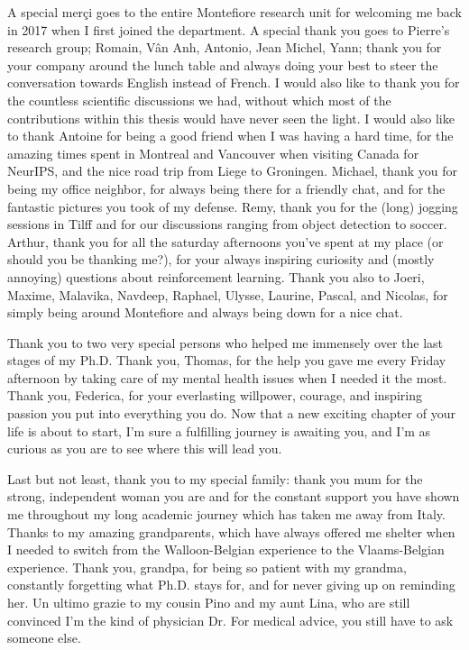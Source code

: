 A special merçi goes to the entire Montefiore research unit for welcoming me back in 2017 when I first joined the department. A special thank you goes to Pierre's research group; Romain, Vân Anh, Antonio, Jean Michel, Yann; thank you for your company around the lunch table and always doing your best to steer the conversation towards English instead of French. I would also like to thank you for the countless scientific discussions we had, without which most of the contributions within this thesis would have never seen the light. I would also like to thank Antoine for being a good friend when I was having a hard time, for the amazing times spent in Montreal and Vancouver when visiting Canada for NeurIPS, and the nice road trip from Liege to Groningen. Michael, thank you for being my office neighbor, for always being there for a friendly chat, and for the fantastic pictures you took of my defense. Remy, thank you for the (long) jogging sessions in Tilff and for our discussions ranging from object detection to soccer. Arthur, thank you for all the saturday afternoons you've spent at my place (or should you be thanking me?), for your always inspiring curiosity and (mostly annoying) questions about reinforcement learning. Thank you also to Joeri, Maxime, Malavika, Navdeep, Raphael, Ulysse, Laurine, Pascal, and Nicolas, for simply being around Montefiore and always being down for a nice chat.

Thank you to two very special persons who helped me immensely over the last stages of my Ph.D. Thank you, Thomas, for the help you gave me every Friday afternoon by taking care of my mental health issues when I needed it the most. Thank you, Federica, for your everlasting willpower, courage, and inspiring passion you put into everything you do. Now that a new exciting chapter of your life is about to start, I'm sure a fulfilling journey is awaiting you, and I'm as curious as you are to see where this will lead you.

Last but not least, thank you to my special family: thank you mum for the strong, independent woman you are and for the constant support you have shown me throughout my long academic journey which has taken me away from Italy. Thanks to my amazing grandparents, which have always offered me shelter when I needed to switch from the Walloon-Belgian experience to the Vlaams-Belgian experience. Thank you, grandpa, for being so patient with my grandma, constantly forgetting what Ph.D. stays for, and for never giving up on reminding her. Un ultimo grazie to my cousin Pino and my aunt Lina, who are still convinced I'm the kind of physician Dr. For medical advice, you still have to ask someone else. 



\endgroup
